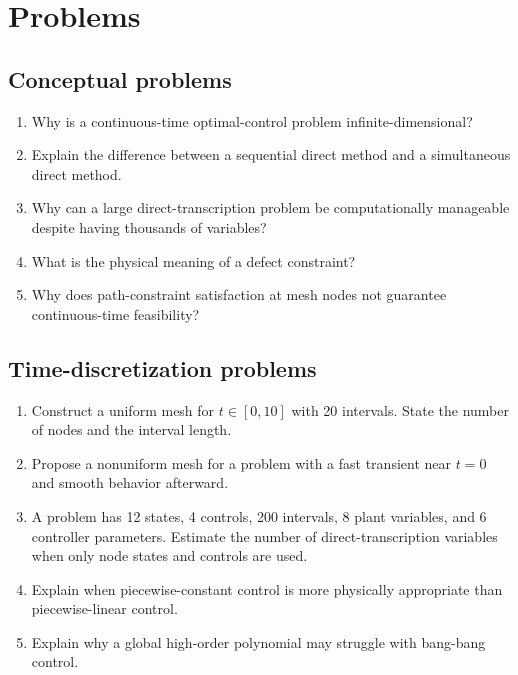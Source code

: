 \documentclass[11pt]{article}
\begin{document}
\section{Problems}

\subsection*{Conceptual problems}
\begin{enumerate}[leftmargin=1.5em,label=\textbf{P\arabic*.}]
  \item Why is a continuous-time optimal-control problem infinite-dimensional?
  \item Explain the difference between a sequential direct method and a simultaneous direct method.
  \item Why can a large direct-transcription problem be computationally manageable despite having thousands of variables?
  \item What is the physical meaning of a defect constraint?
  \item Why does path-constraint satisfaction at mesh nodes not guarantee continuous-time feasibility?
\end{enumerate}

\subsection*{Time-discretization problems}
\begin{enumerate}[leftmargin=1.5em,label=\textbf{P\arabic*.},resume]
  \item Construct a uniform mesh for $t\in[0,10]$ with 20 intervals. State the number of nodes and the interval length.
  \item Propose a nonuniform mesh for a problem with a fast transient near $t=0$ and smooth behavior afterward.
  \item A problem has 12 states, 4 controls, 200 intervals, 8 plant variables, and 6 controller parameters. Estimate the number of direct-transcription variables when only node states and controls are used.
  \item Explain when piecewise-constant control is more physically appropriate than piecewise-linear control.
  \item Explain why a global high-order polynomial may struggle with bang-bang control.
\end{enumerate}
\end{document}
